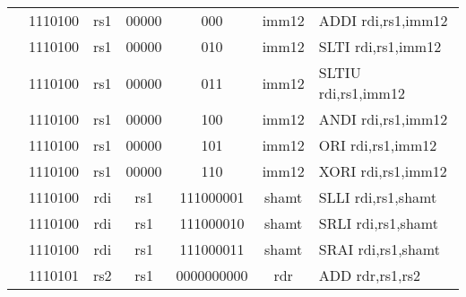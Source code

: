 \begin{table}[p]
\begin{small}
\begin{center}
\begin{tabular}{rcccccccccl}
&
\multicolumn{2}{|c|}{1110100} &
\multicolumn{1}{c|}{rs1} &
\multicolumn{1}{c|}{00000} &
\multicolumn{1}{c|}{000} &
\multicolumn{4}{c|}{imm12} & ADDI rdi,rs1,imm12 \\
\cline{2-10}
  

&
\multicolumn{2}{|c|}{1110100} &
\multicolumn{1}{c|}{rs1} &
\multicolumn{1}{c|}{00000} &
\multicolumn{1}{c|}{010} &
\multicolumn{4}{c|}{imm12} & SLTI rdi,rs1,imm12 \\
\cline{2-10}
  

&
\multicolumn{2}{|c|}{1110100} &
\multicolumn{1}{c|}{rs1} &
\multicolumn{1}{c|}{00000} &
\multicolumn{1}{c|}{011} &
\multicolumn{4}{c|}{imm12} & SLTIU rdi,rs1,imm12 \\
\cline{2-10}
  

&
\multicolumn{2}{|c|}{1110100} &
\multicolumn{1}{c|}{rs1} &
\multicolumn{1}{c|}{00000} &
\multicolumn{1}{c|}{100} &
\multicolumn{4}{c|}{imm12} & ANDI rdi,rs1,imm12 \\
\cline{2-10}
  

&
\multicolumn{2}{|c|}{1110100} &
\multicolumn{1}{c|}{rs1} &
\multicolumn{1}{c|}{00000} &
\multicolumn{1}{c|}{101} &
\multicolumn{4}{c|}{imm12} & ORI rdi,rs1,imm12 \\
\cline{2-10}
  

&
\multicolumn{2}{|c|}{1110100} &
\multicolumn{1}{c|}{rs1} &
\multicolumn{1}{c|}{00000} &
\multicolumn{1}{c|}{110} &
\multicolumn{4}{c|}{imm12} & XORI rdi,rs1,imm12 \\
\cline{2-10}
  

&
\multicolumn{2}{|c|}{1110100} &
\multicolumn{1}{c|}{rdi} &
\multicolumn{1}{c|}{rs1} &
\multicolumn{3}{c|}{111000001} &
\multicolumn{2}{c|}{shamt} & SLLI rdi,rs1,shamt \\
\cline{2-10}
  

&
\multicolumn{2}{|c|}{1110100} &
\multicolumn{1}{c|}{rdi} &
\multicolumn{1}{c|}{rs1} &
\multicolumn{3}{c|}{111000010} &
\multicolumn{2}{c|}{shamt} & SRLI rdi,rs1,shamt \\
\cline{2-10}
  

&
\multicolumn{2}{|c|}{1110100} &
\multicolumn{1}{c|}{rdi} &
\multicolumn{1}{c|}{rs1} &
\multicolumn{3}{c|}{111000011} &
\multicolumn{2}{c|}{shamt} & SRAI rdi,rs1,shamt \\
\cline{2-10}
  

&
\multicolumn{2}{|c|}{1110101} &
\multicolumn{1}{c|}{rs2} &
\multicolumn{1}{c|}{rs1} &
\multicolumn{4}{c|}{0000000000} &
\multicolumn{1}{c|}{rdr} & ADD rdr,rs1,rs2 \\
\cline{2-10}
  


\end{tabular}
\end{center}
\end{small}
\end{table}
